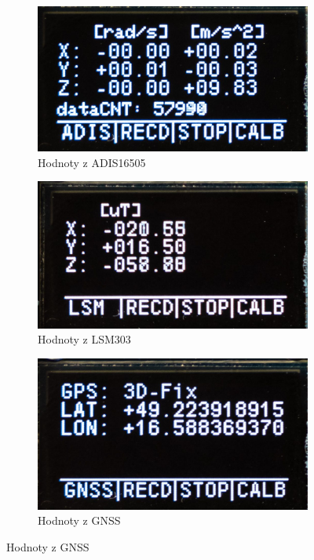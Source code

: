 \begin{itemize}
\begin{figure}[h]
\begin{subfigure}[b]{0.29\textwidth}
     \end{subfigure}
     \hfill
     \centering
     \begin{subfigure}[b]{0.29\textwidth}
         \centering
         \includegraphics[width=\textwidth]{obrazky/menuADIS}
         \caption{Hodnoty z ADIS16505}
       
     \end{subfigure}
     \centering
     \begin{subfigure}[b]{0.29\textwidth}
         \centering
         \includegraphics[width=\textwidth]{obrazky/menuLSM}
         \caption{Hodnoty z LSM303}
       
     \end{subfigure}
		\hfill
     \begin{subfigure}[b]{0.29\textwidth}
         \centering
         \includegraphics[width=\textwidth]{obrazky/menuGPS}
         \caption{Hodnoty z GNSS}
         

\end{subfigure}
\end{figure}
\end{itemize}
